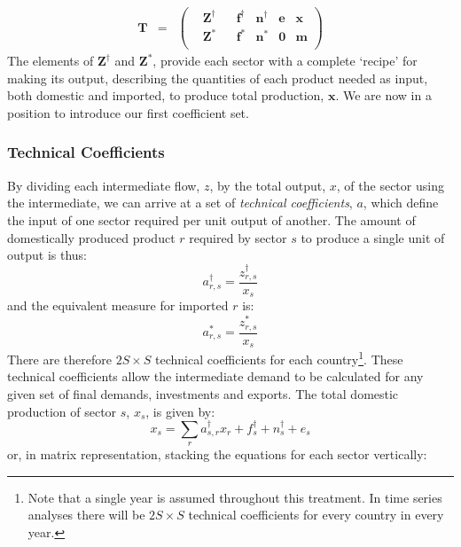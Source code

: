 \documentclass[a4paper]{article}
\begin{document}
\begin{equation}\label{eqn:Tvectorised}
\begin{array}{rcc}
\boldsymbol{T} & = & 
\left(
	\begin{array}{ccccccc}
 & \boldsymbol{Z}^{\dag} & & \boldsymbol{f}^\dag & \boldsymbol{n}^\dag & \boldsymbol{e} & \boldsymbol{x} \\
 & \boldsymbol{Z}^* & & \boldsymbol{f}^* & \boldsymbol{n}^* & \boldsymbol{0} & \boldsymbol{m} \\
	\end{array} 
\right)
\end{array}
\end{equation}
The elements of $\boldsymbol{Z}^\dagger$ and $\boldsymbol{Z}^*$, provide each sector with a complete `recipe' for making its output, describing the quantities of each product needed as input, both domestic and imported, to produce total production, $\boldsymbol{x}$. 
We are now in a position to introduce our first coefficient set.

\subsubsection*{Technical Coefficients}\label{sec:techcoeffs}
By dividing each intermediate flow, $z$, by the total output, $x$, of the sector using the intermediate, we can arrive at a set of \textit{technical coefficients}, $a$, which define the input of one sector required per unit output of another.
The amount of domestically produced product $r$ required by sector $s$ to produce a single unit of output is thus:
\begin{equation}\label{eq:adagger}
a_{r,s}^\dagger = \frac{z^\dagger_{r,s}}{x_s}
\end{equation}
and the equivalent measure for imported $r$ is:
\begin{equation}\label{eq:astar}
a_{r,s}^* = \frac{z^*_{r,s}}{x_s}
\end{equation}
There are therefore $2S \times S$ technical coefficients for each country\footnote{Note that a single year is assumed throughout this treatment.
In time series analyses there will be $2S \times S$ technical coefficients for every country in every year.}.
These technical coefficients allow the intermediate demand to be calculated for any given set of final demands, investments and exports. The total domestic production of sector $s$, $x_s$, is given by:
$$
x_s = \sum_r{a^\dagger_{s,r}x_r} + f^\dagger_s + n^\dagger_s + e_s 
$$
or, in matrix representation, stacking the equations for each sector vertically:
\end{document}

